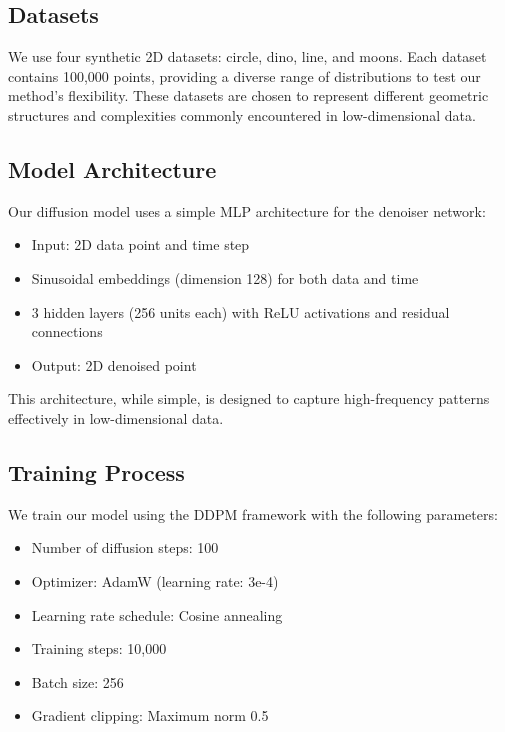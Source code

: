 \documentclass{article} %
\begin{document}
\subsection{Datasets}

We use four synthetic 2D datasets: circle, dino, line, and moons. Each dataset contains 100,000 points, providing a diverse range of distributions to test our method's flexibility. These datasets are chosen to represent different geometric structures and complexities commonly encountered in low-dimensional data.

\subsection{Model Architecture}

Our diffusion model uses a simple MLP architecture for the denoiser network:

\begin{itemize}
    \item Input: 2D data point and time step
    \item Sinusoidal embeddings (dimension 128) for both data and time
    \item 3 hidden layers (256 units each) with ReLU activations and residual connections
    \item Output: 2D denoised point
\end{itemize}

This architecture, while simple, is designed to capture high-frequency patterns effectively in low-dimensional data.

\subsection{Training Process}

We train our model using the DDPM framework \cite{ddpm} with the following parameters:

\begin{itemize}
    \item Number of diffusion steps: 100
    \item Optimizer: AdamW (learning rate: 3e-4)
    \item Learning rate schedule: Cosine annealing
    \item Training steps: 10,000
    \item Batch size: 256
    \item Gradient clipping: Maximum norm 0.5
\end{itemize}
\end{document}
